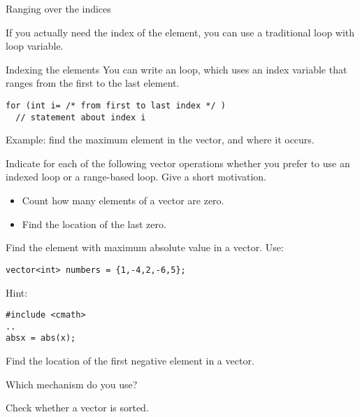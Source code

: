  {Ranging over the indices}

If you actually need the index of the element, you can use a
traditional  loop with loop variable.

\begin{block}{Indexing the elements}
  \label{sl:index-range}
  You can write an  loop, which uses an
  index variable that ranges from the first to the last element.
\begin{lstlisting}
for (int i= /* from first to last index */ )
  // statement about index i
\end{lstlisting}
Example: find the maximum element in the vector, and where it occurs.
%
\renewcommand\snippetcodefraction{.67}
\renewcommand\snippetanswfraction{.3}
\end{block}

\begin{exercise}
  \label{ex:range-for}
  Indicate for each of the following vector operations whether you
  prefer to use an indexed loop or a range-based loop. Give a short
  motivation.
  \begin{itemize}
  \item Count how many elements of a vector are zero.
  \item Find the location of the last zero.
  \end{itemize}
\end{exercise}

\begin{exercise}
  \label{ex:array-max}
  Find the element with maximum absolute value in a vector. Use:
\begin{lstlisting}
vector<int> numbers = {1,-4,2,-6,5};
\end{lstlisting}

Hint:
\begin{lstlisting}
#include <cmath>
..
absx = abs(x);
\end{lstlisting}
\end{exercise}

\begin{exercise}
  \label{ex:array-maxidx}
  Find the location of the first negative element in a vector.

  Which mechanism do you use?
\end{exercise}

\begin{exercise}
  \label{ex:array-sorted}
  Check whether a vector is sorted.
\end{exercise}

